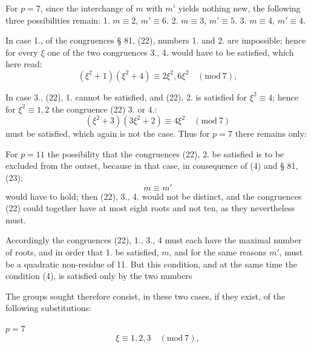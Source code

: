 
For $p = 7$, since the interchange of $m$ with $m'$ yields nothing new, the following three possibilities remain: 1. $m \equiv 2$, $m' \equiv 6$. 2. $m \equiv 3$, $m' \equiv 5$. 3. $m \equiv 4$, $m' \equiv 4$.

In case 1., of the congruences § 81, (22), numbers 1. and 2. are impossible; hence for every $\xi$ one of the two congruences 3., 4. would have to be satisfied, which here read:
\[
(\xi^2 + 1)(\xi^2 + 4) \equiv 2\xi^2, 6\xi^2 \quad (\mathrm{mod}\ 7),
\]

In case 3., (22), 1. cannot be satisfied, and (22), 2. is satisfied for $\xi^2 \equiv 4$; hence for $\xi^2 \equiv 1, 2$ the congruence (22) 3. or 4.:
\[
(\xi^2 + 3)(3\xi^2 + 2) \equiv 4\xi^2 \quad (\mathrm{mod}\ 7)
\]
must be satisfied, which again is not the case. Thus for $p = 7$ there remains only:

For $p = 11$ the possibility that the congruences (22), 2. be satisfied is to be excluded from the outset, because in that case, in consequence of (4) and § 81, (23):
\[
m \equiv m'
\]
would have to hold; then (22), 3., 4. would not be distinct, and the congruences (22) could together have at most eight roots and not ten, as they nevertheless must.

Accordingly the congruences (22), 1., 3., 4 must each have the maximal number of roots, and in order that 1. be satisfied, $m$, and for the same reasons $m'$, must be a quadratic non-residue of 11. But this condition, and at the same time the condition (4), is satisfied only by the two numbers

The groups sought therefore consist, in these two cases, if they exist, of the following substitutions:

$p = 7$
\[
\xi \equiv 1, 2, 3 \quad (\mathrm{mod}\ 7),
\]

